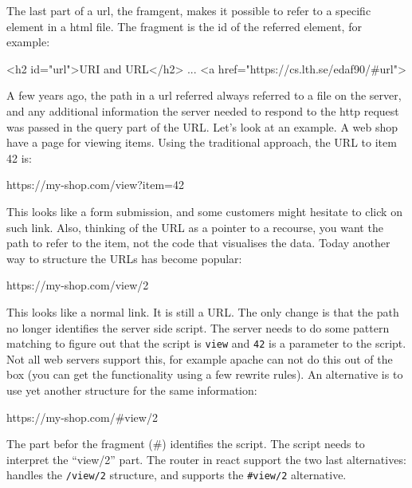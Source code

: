 The last part of a url, the framgent, makes it possible to refer to a specific element in a html file. The fragment is the id of the referred element, for example:
\begin{Code}
<h2 id="url">URI and URL</h2>
...
<a href="https://cs.lth.se/edaf90/#url">
\end{Code}

A few years ago, the path in a url referred always referred to a file on the server, and any additional information the server needed to respond to the http request was passed in the query part of the URL. Let's look at an example. A web shop have a page for viewing items. Using the traditional approach, the URL to item 42 is:
\begin{Code}
https://my-shop.com/view?item=42
\end{Code}
This looks like a form submission, and some customers might hesitate to click on such link. Also, thinking of the URL as a pointer to a recourse, you want the path to refer to the item, not the code that visualises the data. Today another way to structure the URLs has become popular:
\begin{Code}
https://my-shop.com/view/2
\end{Code}
This looks like a normal link. It is still a URL. The only change is that the path no longer identifies the server side script. The server needs to do some pattern matching to figure out that the script is \texttt{view} and \texttt{42} is a parameter to the script. Not all web servers support this, for example apache can not do this out of the box (you can get the functionality using a few rewrite rules). An alternative is to use yet another structure for the same information:
\begin{Code}
https://my-shop.com/#view/2
\end{Code}
The part befor the fragment (\#) identifies the script. The script needs to interpret the ``view/2'' part. The router in react support the two last alternatives:  handles the \texttt{/view/2} structure, and  supports the \texttt{\#view/2} alternative.

